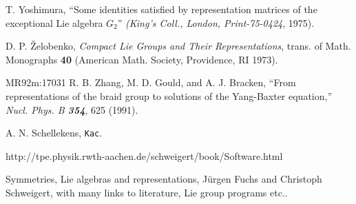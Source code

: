 


 T. Yoshimura, %
``Some identities satisfied by representation matrices of the
exceptional Lie algebra $G_2$'' %
{\em (King's Coll., London, Print-75-0424}, 1975).






 D. P. \v{Z}elobenko,
{\em Compact Lie Groups and Their Representations},
trans. of Math. Monographs {\bf 40}
(American Math. Society, Providence, RI 1973).

        {MR92m:17031}
R. B. Zhang, M. D. Gould, and A. J. Bracken,
``From representations of
  the braid group to solutions of the Yang-Baxter equation,''
{\em Nucl. Phys. B  \bf 354}, 625 (1991).   %




A. N. Schellekens,
    {\tt Kac}.

http://tpe.physik.rwth-aachen.de/schweigert/book/Software.html

 Symmetries, Lie algebras and representations,
    J{\"u}rgen Fuchs and Christoph Schweigert, with many links to literature, Lie group programs etc..

